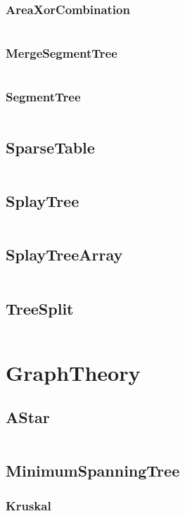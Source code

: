 \documentclass[a4paper,11pt]{article}
\begin{document}
\subsubsection{AreaXorCombination}
\inputminted[breaklines]{c++}{DataStructure/+SegmentTree/+AreaXorCombination.cpp}
\subsubsection{MergeSegmentTree}
\inputminted[breaklines]{c++}{DataStructure/+SegmentTree/+MergeSegmentTree.cpp}
\subsubsection{SegmentTree}
\inputminted[breaklines]{c++}{DataStructure/+SegmentTree/+SegmentTree.cpp}

\subsection{SparseTable}
\inputminted[breaklines]{c++}{DataStructure/+SparseTable.cpp}
\subsection{SplayTree}
\inputminted[breaklines]{c++}{DataStructure/+SplayTree.cpp}
\subsection{SplayTreeArray}
\inputminted[breaklines]{c++}{DataStructure/+SplayTreeArray.cpp}
\subsection{TreeSplit}
\inputminted[breaklines]{c++}{DataStructure/+TreeSplit.cpp}

\newpage
\section{GraphTheory}
\subsection{AStar}
\inputminted[breaklines]{c++}{GraphTheory/+AStar.cpp}
\subsection{MinimumSpanningTree}
\subsubsection{Kruskal}
\inputminted[breaklines]{c++}{GraphTheory/+MinimumSpanningTree/+Kruskal.cpp}
\end{document}
